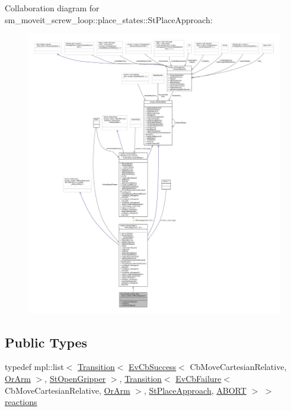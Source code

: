 Collaboration diagram for sm\+\_\+moveit\+\_\+screw\+\_\+loop\+:\+:place\+\_\+states\+:\+:St\+Place\+Approach\+:
\nopagebreak
\begin{figure}[H]
\begin{center}
\leavevmode
\includegraphics[width=350pt]{structsm__moveit__screw__loop_1_1place__states_1_1StPlaceApproach__coll__graph}
\end{center}
\end{figure}
\subsection*{Public Types}
\begin{DoxyCompactItemize}
\item 
typedef mpl\+::list$<$ \hyperlink{classsmacc_1_1Transition}{Transition}$<$ \hyperlink{structsmacc_1_1EvCbSuccess}{Ev\+Cb\+Success}$<$ Cb\+Move\+Cartesian\+Relative, \hyperlink{classsm__moveit__screw__loop_1_1OrArm}{Or\+Arm} $>$, \hyperlink{structsm__moveit__screw__loop_1_1place__states_1_1StOpenGripper}{St\+Open\+Gripper} $>$, \hyperlink{classsmacc_1_1Transition}{Transition}$<$ \hyperlink{structsmacc_1_1EvCbFailure}{Ev\+Cb\+Failure}$<$ Cb\+Move\+Cartesian\+Relative, \hyperlink{classsm__moveit__screw__loop_1_1OrArm}{Or\+Arm} $>$, \hyperlink{structsm__moveit__screw__loop_1_1place__states_1_1StPlaceApproach}{St\+Place\+Approach}, \hyperlink{structsmacc_1_1default__transition__tags_1_1ABORT}{A\+B\+O\+RT} $>$ $>$ \hyperlink{structsm__moveit__screw__loop_1_1place__states_1_1StPlaceApproach_a8f513478d2e58f9df846b4ea7ac77075}{reactions}
\end{DoxyCompactItemize}
